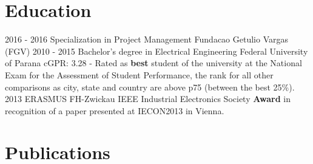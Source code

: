 \documentclass[]{friggeri-cv}
\begin{document}
\section{Education}
\begin{entrylist}
  \entry
    {2016 - 2016}
    {Specialization in Project Management}
    {Fundacao Getulio Vargas (FGV)}
    {}
  \entry
    {2010 - 2015}
    {Bachelor's degree in Electrical Engineering}
    {Federal University of Parana}
    {cGPR: 3.28 - Rated as \textbf{best} student of the university at the National Exam for the Assessment of Student Performance, the rank for all other comparisons as city, state and country are above p75 (between the best 25\%). \\}
  \entry
    {2013}
    {ERASMUS}
    {FH-Zwickau}
    {IEEE Industrial Electronics Society \textbf{Award} in recognition of a paper presented at IECON2013 in Vienna.}
\end{entrylist}

\newpage


\section{Publications}
\end{document}
